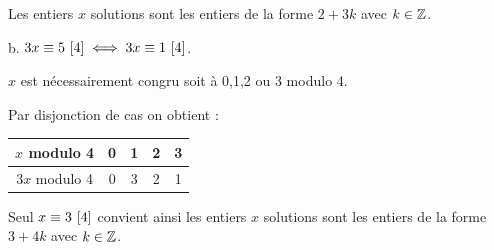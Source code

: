 \documentclass[10pt,a4paper]{article}
\begin{document}
Les entiers $x$ solutions sont les entiers de la forme $2+3k$ avec $k \in \mathbb{Z}$.

b. ${3x} \equiv {5} ~ [{4}] \iff {3x} \equiv {1} ~ [{4}]$.

$x$ est nécessairement congru soit à 0,1,2 ou 3 modulo 4.

Par disjonction de cas on obtient : \begin{tabular}{|c|c|c|c|c|}
\hline 
$x$ modulo 4 & 0 & 1 & 2 & 3 \\ 
\hline 
$3x$ modulo 4 & 0 & 3 & 2 & 1 \\ 
\hline 
\end{tabular} 

Seul ${x} \equiv {3} ~ [{4}]$ convient ainsi les entiers $x$ solutions sont les entiers de la forme $3+4k$ avec $k \in \mathbb{Z}$.
\end{document}
